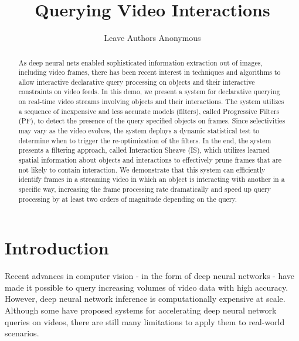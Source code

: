 \documentclass[sigconf]{acmart}
\author{Leave Authors Anonymous}
\affiliation{%
  \institution{}
  \streetaddress{}
  \city{}
  \country{}}
\begin{document}
\title{Querying Video Interactions}


\begin{abstract}
As deep neural nets enabled sophisticated information extraction out of images, including video frames, there has been recent interest in techniques and algorithms to allow interactive declarative query processing on objects and their interactive constraints on video feeds. 
In this demo, we present a system for declarative querying on real-time video streams involving objects and their interactions. The system utilizes a sequence of inexpensive and less accurate models (filters), called Progressive Filters (PF), to detect the presence of the query specified objects on frames. 
Since selectivities may vary as the video evolves, the system deploys a dynamic statistical test to determine when to trigger the re-optimization of the filters. 
In the end, the system presents a filtering approach, called Interaction Sheave (IS), which utilizes learned spatial information about objects and interactions to effectively prune frames that are not likely to contain interaction.
We demonstrate that this system can efficiently identify frames in a streaming video in which an object is interacting with another in a specific way, increasing the frame processing rate dramatically and speed up query processing by at least two orders of magnitude depending on the query. 
\end{abstract}

\maketitle


\section{Introduction}

Recent advances in computer vision - in the form of deep neural networks - have made it possible to query increasing volumes of video data with high accuracy. However, deep neural network inference is computationally expensive at scale. Although some have proposed systems for accelerating deep neural network queries on videos, there are still many limitations to apply them to real-world scenarios. 
\end{document}
